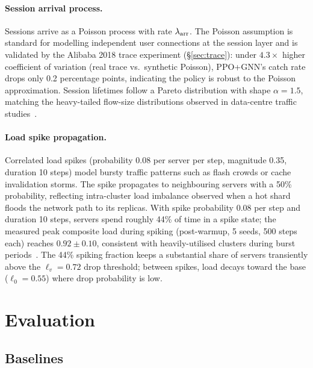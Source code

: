 \documentclass[review,1p]{elsarticle}
\theoremstyle{definition}
\begin{document}
\paragraph{Session arrival process.}
Sessions arrive as a Poisson process with rate $\lambda_{\rm arr}$.
The Poisson assumption is standard for modelling independent user
connections at the session layer and is validated by the Alibaba 2018
trace experiment (\S\ref{sec:trace}): under $4.3\times$ higher
coefficient of variation (real trace vs.\ synthetic Poisson), PPO+GNN's
catch rate drops only 0.2 percentage points, indicating the policy is
robust to the Poisson approximation.  Session lifetimes follow a
Pareto distribution with shape $\alpha{=}1.5$, matching the heavy-tailed
flow-size distributions observed in data-centre traffic
studies~\cite{sigcomm19decima}.

\paragraph{Load spike propagation.}
Correlated load spikes (probability 0.08 per server per step, magnitude
0.35, duration 10 steps) model bursty traffic patterns such as
flash crowds or cache invalidation storms.  The spike propagates to
neighbouring servers with a 50\% probability, reflecting
intra-cluster load imbalance observed when a hot shard floods the
network path to its replicas.  With spike probability 0.08 per step
and duration 10 steps, servers spend roughly 44\% of time in a spike
state; the measured peak composite load during spiking (post-warmup, 5 seeds,
500 steps each) reaches $0.92 \pm 0.10$, consistent with heavily-utilised
clusters during burst periods~\cite{riotdirect}.
The 44\% spiking fraction keeps a substantial share of servers transiently
above the $\ell_v{=}0.72$ drop threshold; between spikes, load
decays toward the base ($\ell_0{=}0.55$) where drop probability is low.

\section{Evaluation}
\label{sec:evaluation}

\subsection{Baselines}
\end{document}
